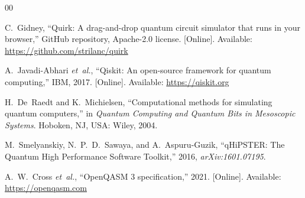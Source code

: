 \documentclass[conference]{IEEEtran}
\begin{document}
\begin{thebibliography}{00}

C.~Gidney, ``Quirk: A drag-and-drop quantum circuit simulator that runs in your browser,'' GitHub repository, Apache-2.0 license. [Online]. Available: \url{https://github.com/strilanc/quirk}

A.~Javadi-Abhari \emph{et~al.}, ``Qiskit: An open-source framework for quantum computing,'' IBM, 2017. [Online]. Available: \url{https://qiskit.org}

H.~De~Raedt and K.~Michielsen, ``Computational methods for simulating quantum computers,'' in \emph{Quantum Computing and Quantum Bits in Mesoscopic Systems}. Hoboken, NJ, USA: Wiley, 2004.

M.~Smelyanskiy, N.~P.~D.~Sawaya, and A.~Aspuru-Guzik, ``qHiPSTER: The Quantum High Performance Software Toolkit,'' 2016, \emph{arXiv:1601.07195}.

A.~W.~Cross \emph{et~al.}, ``OpenQASM 3 specification,'' 2021. [Online]. Available: \url{https://openqasm.com}

\end{thebibliography}
\end{document}
